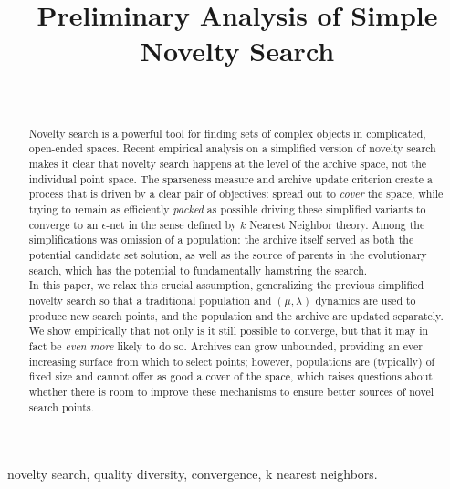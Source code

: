 \documentclass[twoside]{article}
\begin{document}
\title{\bf Preliminary Analysis of Simple Novelty Search}  

\author{ \hfill {}\\ 
}

\maketitle

\begin{abstract}
Novelty search is a powerful tool for finding sets of complex objects in complicated, open-ended spaces.  Recent empirical analysis on a simplified version of novelty search makes it clear that novelty search happens at the level of the archive space, not the individual point space.  The sparseness measure and archive update criterion create a process that is driven by a clear pair of objectives:  spread out to \emph{cover} the space, while trying to remain as efficiently \emph{packed} as possible driving these simplified variants to converge to an $\epsilon$-net in the sense defined by $k$ Nearest Neighbor theory.  Among the simplifications was omission of a population:  the archive itself served as both the potential candidate set solution, as well as the source of parents in the evolutionary search, which has the potential to fundamentally hamstring the search.\\[-0.5ex]

In this paper, we relax this crucial assumption, generalizing the previous simplified novelty search so that a traditional population and $(\mu, \lambda)$ dynamics are used to produce new search points, and the population and the archive are updated separately.  We show empirically that not only is it still possible to converge, but that it may in fact be \emph{even more} likely to do so.  Archives can grow unbounded, providing an ever increasing surface from which to select points; however, populations are (typically) of fixed size and cannot offer as good a cover of the space, which raises questions about whether there is room to improve these mechanisms to ensure better sources of novel search points.
\end{abstract}

\begin{keywords}
novelty search, 
quality diversity,
convergence,
k nearest neighbors.
\end{keywords}
\end{document}
